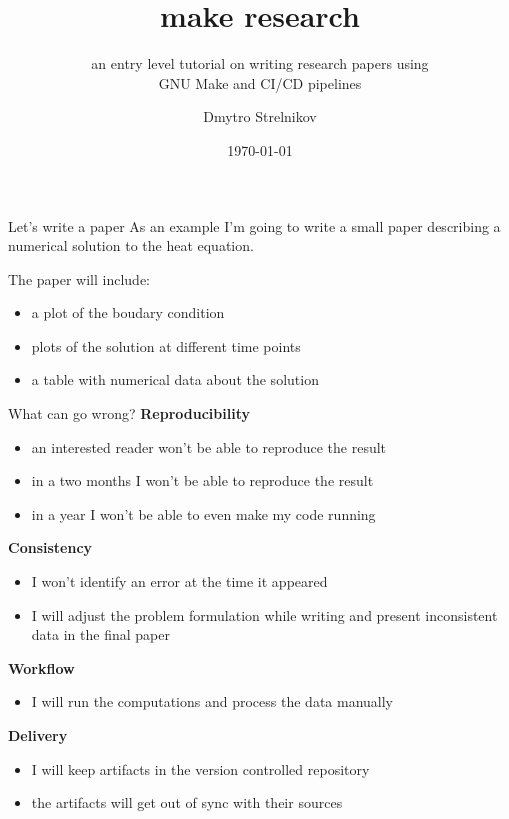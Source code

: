 \documentclass[
	9pt,
	hyperref = {unicode,pdfpagelabels=false},
	aspectratio = 43
	]{beamer}
\title{make research}
\subtitle{an entry level tutorial on writing research papers using\\ GNU Make and CI/CD pipelines}
\author{Dmytro Strelnikov}
\institute{Technische Universität Chemnitz}
\date{\today}
\begin{document}
\maketitle
\begin{frame}{Let's write a paper}
	As an example I'm going to write a small paper describing a numerical solution to the heat equation.

	The paper will include:
	\begin{itemize}
		\item a plot of the boudary condition
		\item plots of the solution at different time points
		\item a table with numerical data about the solution
	\end{itemize}
\end{frame}

\begin{frame}{What can go wrong?}
	\textbf{Reproducibility}
	\begin{itemize}
		\item an interested reader won't be able to reproduce the result
		\item in a two months I won't be able to reproduce the result
		\item in a year I won't be able to even make my code running
	\end{itemize}

	\textbf{Consistency}
	\begin{itemize}
		\item I won't identify an error at the time it appeared
		\item I will adjust the problem formulation while writing and present inconsistent data in the final paper
	\end{itemize}

	\textbf{Workflow}
	\begin{itemize}
		\item I will run the computations and process the data manually
	\end{itemize}

	\textbf{Delivery}
	\begin{itemize}
		\item I will keep artifacts in the version controlled repository
		\item the artifacts will get out of sync with their sources
	\end{itemize}
\end{frame}
\end{document}

